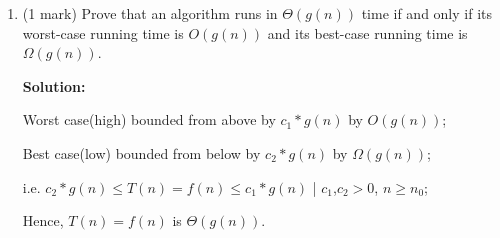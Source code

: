 \documentclass[a4,13pt]{extarticle}
\newenvironment{Solution}{\color{blue}\textbf{Solution:}}{}
\begin{document}
\begin{enumerate}
\begin{enumerate}
	      	\begin{Solution}
	      	Yes and no. Although the answer will not be very accurate as we drop the lower order terms and the constants that may affect the actual $T(n)$ but the Big-$\Omega$ will provide a $g(n)$ that are a class of functions that will give us a estimate of the best case as it is a bound on the entire $T(n)$ from below multiplied by a $c>0$. And similarly a Big-$O$ will give us a $h(n)$ multiplied with a constant $d>0$ that will be an estimate for the upper bound of the entire $T(n)$ giving us a estimate of the worst case.
	      	
	      	So, final answer is yes as for big values of $n$ we can get a fair insight on how the algorithm behaves in best and worst cases. Big values of $n$ are the ones that are actually useful.
	      	\end{Solution}
	      	      	      	                  
	      	\item (1 mark) Prove that an algorithm runs in $\Theta (g(n))$ time if and only if its worst-case running time 
	      	      is $O(g(n))$ and its best-case running time is $\Omega(g(n))$.
	      	      
	      	\begin{Solution}
	      	
	      	Worst case(high) bounded from above by $c_{\text{1}} * g(n)$ by $O(g(n))$;
	      	
	      	Best case(low) bounded from below by $c_{\text{2}} * g(n)$ by $\Omega(g(n))$;
	      	
	      	i.e. $c_{\text{2}} * g(n) \le T(n)=f(n) \le c_{\text{1}} * g(n)$ | $c_{\text{1}}$,$c_{\text{2}}>0$,  $n\geq n_{\text{0}}$;
	      	
	      	Hence, $T(n)=f(n)$ is $\Theta(g(n))$.
	      	
	      	
	      	\end{Solution}
	      	      	      	                  
	      \end{enumerate}
	      	          
	      \newpage 
	      	

\end{enumerate}
\end{document}
